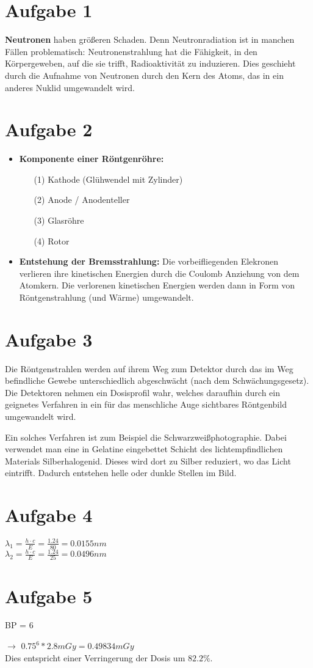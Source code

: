 \section{Aufgabe 1}
\textbf{Neutronen} haben größeren Schaden. Denn Neutronradiation ist in manchen Fällen problematisch: Neutronenstrahlung hat die Fähigkeit, in den Körpergeweben, auf die sie trifft, Radioaktivität zu induzieren. Dies geschieht durch die Aufnahme von Neutronen durch den Kern des Atoms, das in ein anderes Nuklid umgewandelt wird.

\section{Aufgabe 2}
\begin{itemize}
    \item \textbf{Komponente einer Röntgenröhre: }
        \begin{itemize}
            \item[(1)] Kathode (Glühwendel mit Zylinder)
            \item[(2)] Anode / Anodenteller
            \item[(3)] Glasröhre
            \item[(4)] Rotor
        \end{itemize}
    \item \textbf{Entstehung der Bremsstrahlung: } Die vorbeifliegenden Elekronen verlieren ihre kinetischen Energien durch die Coulomb Anziehung von dem Atomkern. Die verlorenen kinetischen Energien werden dann in Form von Röntgenstrahlung (und Wärme) umgewandelt.
\end{itemize}
\section{Aufgabe 3}

Die Röntgenstrahlen werden auf ihrem Weg zum Detektor durch das im Weg befindliche Gewebe unterschiedlich abgeschwächt (nach dem Schwächungsgesetz). Die Detektoren nehmen ein Dosisprofil wahr, welches daraufhin durch ein geignetes Verfahren in ein für das menschliche Auge sichtbares Röntgenbild umgewandelt wird.

Ein solches Verfahren ist zum Beispiel die Schwarzweißphotographie. Dabei verwendet man eine in Gelatine eingebettet Schicht des lichtempfindlichen Materials Silberhalogenid. Dieses wird dort zu Silber reduziert, wo das Licht eintrifft. Dadurch entstehen helle oder dunkle Stellen im Bild.

\section{Aufgabe 4}
$\lambda_1 = \frac{h\cdot c}{E} = \frac{1.24}{80} = 0.0155nm$ \\
$\lambda_2 = \frac{h\cdot c}{E} = \frac{1.24}{25} = 0.0496nm$

\section{Aufgabe 5}
BP = 6

$\rightarrow$ $0.75^6 * 2.8mGy = 0.49834 mGy$\\

Dies entspricht einer Verringerung der Dosis um $82.2\%$.
